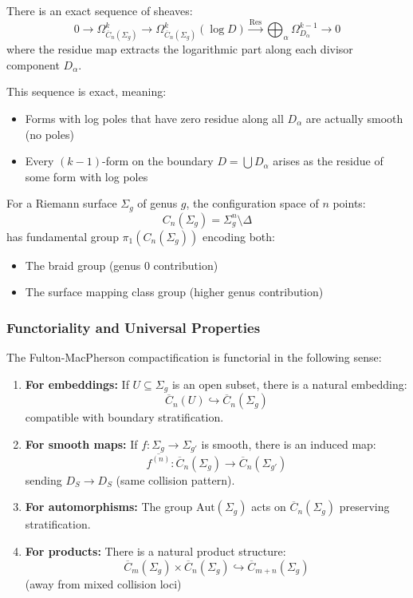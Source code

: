 \begin{theorem}\label{thm:residue-sequence}
There is an exact sequence of sheaves:
$$0 \to \Omega^k_{\overline{C}_n(\Sigma_g)} \to \Omega^k_{\overline{C}_n(\Sigma_g)}(\log D) \xrightarrow{\text{Res}} \bigoplus_{\alpha} \Omega^{k-1}_{D_\alpha} \to 0$$
where the residue map extracts the logarithmic part along each divisor component $D_\alpha$.

This sequence is exact, meaning:
\begin{itemize}
\item Forms with log poles that have zero residue along all $D_\alpha$ are actually smooth (no poles)
\item Every $(k-1)$-form on the boundary $D = \bigcup D_\alpha$ arises as the residue of some form with log poles
\end{itemize}
\end{theorem}

For a Riemann surface $\Sigma_g$ of genus $g$, the configuration space of $n$ points:
$$C_n(\Sigma_g) = \Sigma_g^n \setminus \Delta$$
has fundamental group $\pi_1(C_n(\Sigma_g))$ encoding both:
\begin{itemize}
\item The braid group (genus 0 contribution)
\item The surface mapping class group (higher genus contribution)
\end{itemize}

\subsubsection{Functoriality and Universal Properties}

\begin{theorem}\label{thm:FM-functorial}
The Fulton-MacPherson compactification is functorial in the following sense:

\begin{enumerate}
\item \textbf{For embeddings:} If $U \subseteq \Sigma_g$ is an open subset, there is a natural embedding:
$$\overline{C}_n(U) \hookrightarrow \overline{C}_n(\Sigma_g)$$
compatible with boundary stratification.

\item \textbf{For smooth maps:} If $f: \Sigma_g \to \Sigma_{g'}$ is smooth, there is an induced map:
$$\overline{f^{(n)}}: \overline{C}_n(\Sigma_g) \to \overline{C}_n(\Sigma_{g'})$$
sending $D_S \to D_S$ (same collision pattern).

\item \textbf{For automorphisms:} The group $\text{Aut}(\Sigma_g)$ acts on $\overline{C}_n(\Sigma_g)$ preserving stratification.

\item \textbf{For products:} There is a natural product structure:
$$\overline{C}_m(\Sigma_g) \times \overline{C}_n(\Sigma_g) \hookrightarrow \overline{C}_{m+n}(\Sigma_g)$$
(away from mixed collision loci)
\end{enumerate}
\end{theorem}


